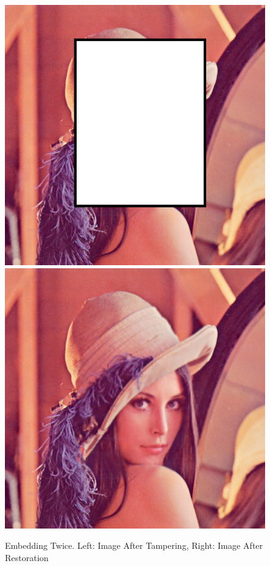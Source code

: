 \documentclass[12pt]{article}
\begin{document}
\begin{figure}[h]
\centerline{%
\includegraphics[scale=0.45]{"Lena Embed twice 0.7 threshold/finalImage - Copy"}%
\hspace{0.1cm}
\includegraphics[scale=0.45]{"Lena Embed twice 0.7 threshold/finalImageAfterRestoration"}%
}%
\caption{Embedding Twice. Left: Image After Tampering, Right: Image After Restoration}
\label{fig:lenaEmbedTwiceRestoration}
\end{figure}
\end{document}
